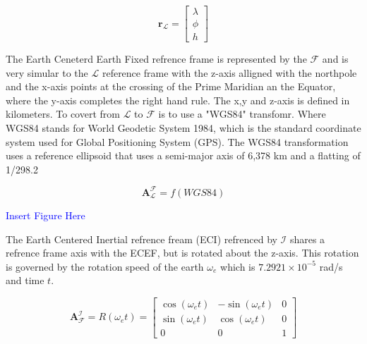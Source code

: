 \begin{equation}
    \mathbf{r}_\mathcal{L} = \begin{bmatrix}
    \lambda \\
    \phi \\
    h    
    \end{bmatrix} 
\end{equation}



The Earth Ceneterd Earth Fixed refrence frame is represented by the $\mathcal{F}$ and is very simular to the $\mathcal{L}$ reference frame with the z-axis alligned with the northpole
and the x-axis points at the crossing of the Prime Maridian an the Equator, where the y-axis completes the right hand rule. The x,y and z-axis is defined in kilometers.
To covert from $\mathcal{L}$ to $\mathcal{F}$ is to use a "WGS84" transfomr. Where WGS84 stands for World Geodetic System 1984, which is the standard coordinate system used for
Global Positioning System (GPS). The WGS84 transformation uses a reference ellipsoid that uses a semi-major axis of 6,378 km and a flatting of 1/298.2

\begin{equation}
        \mathbf{A}_{\mathcal{L}}^{\mathcal{F}} = f(WGS84)
\end{equation}

\textcolor{blue}{Insert Figure Here}


The Earth Centered Inertial refrence fream (ECI) refrenced by $\mathcal{I}$ shares a refrence frame axis with the ECEF, but is rotated about the z-axis. This rotation is governed
by the rotation speed of the earth $\omega_e$ which is $7.2921\times10^{-5}$ rad/s and time $t$.

\begin{equation}
    \mathbf{A}_{\mathcal{F}}^{\mathcal{I}} = R(\omega_e t) = 
    \begin{bmatrix}
        \cos(\omega_e t) & -\sin(\omega_e t) & 0\\
        \sin(\omega_e t) & \cos(\omega_e t) & 0\\
        0 & 0 & 1
    \end{bmatrix}
\end{equation}

